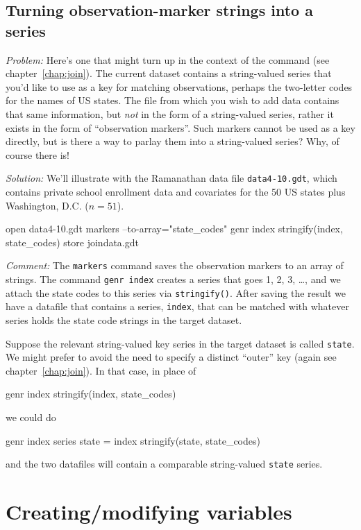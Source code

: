 \subsection{Turning observation-marker strings into a series}

\emph{Problem:} Here's one that might turn up in the context of the
 command (see chapter~\ref{chap:join}). The current dataset
contains a string-valued series that you'd like to use as a key for
matching observations, perhaps the two-letter codes for the names of
US states. The file from which you wish to add data contains that same
information, but \textit{not} in the form of a string-valued series,
rather it exists in the form of ``observation markers''. Such markers
cannot be used as a key directly, but is there a way to parlay them
into a string-valued series? Why, of course there is!

\emph{Solution:}
We'll illustrate with the Ramanathan data file \texttt{data4-10.gdt},
which contains private school enrollment data and covariates for the
50 US states plus Washington, D.C. ($n = 51$).
\begin{code}
open data4-10.gdt
markers --to-array="state_codes"
genr index
stringify(index, state_codes)
store joindata.gdt
\end{code}

\emph{Comment:} The \texttt{markers} command saves the observation
markers to an array of strings. The command \texttt{genr index}
creates a series that goes 1, 2, 3, \dots{}, and we attach the state
codes to this series via \texttt{stringify()}. After saving the result
we have a datafile that contains a series, \texttt{index}, that can be
matched with whatever series holds the state code strings in the
target dataset.

Suppose the relevant string-valued key series in the target dataset is
called \texttt{state}. We might prefer to avoid the need to specify a
distinct ``outer'' key (again see chapter~\ref{chap:join}). In that
case, in place of
\begin{code}
genr index
stringify(index, state_codes)
\end{code}
we could do
\begin{code}
genr index
series state = index
stringify(state, state_codes)
\end{code}
and the two datafiles will contain a comparable string-valued
\texttt{state} series.

\section{Creating/modifying variables}

